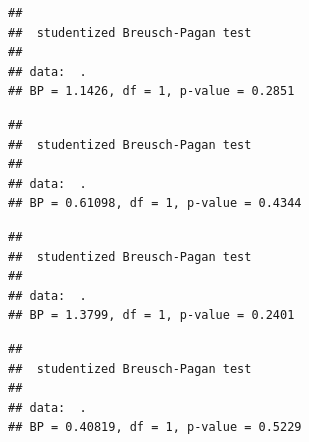 \documentclass[11pt,]{article}
\newenvironment{Shaded}{\begin{snugshade}}{\end{snugshade}}
\newcommand{\KeywordTok}[1]{\textcolor[rgb]{0.13,0.29,0.53}{\textbf{#1}}}
\newcommand{\StringTok}[1]{\textcolor[rgb]{0.31,0.60,0.02}{#1}}
\newcommand{\OperatorTok}[1]{\textcolor[rgb]{0.81,0.36,0.00}{\textbf{#1}}}
\newcommand{\NormalTok}[1]{#1}
\begin{document}
\begin{verbatim}
## 
##  studentized Breusch-Pagan test
## 
## data:  .
## BP = 1.1426, df = 1, p-value = 0.2851
\end{verbatim}

\begin{Shaded}
\end{Shaded}

\begin{verbatim}
## 
##  studentized Breusch-Pagan test
## 
## data:  .
## BP = 0.61098, df = 1, p-value = 0.4344
\end{verbatim}

\begin{Shaded}
\end{Shaded}

\begin{verbatim}
## 
##  studentized Breusch-Pagan test
## 
## data:  .
## BP = 1.3799, df = 1, p-value = 0.2401
\end{verbatim}

\begin{Shaded}
\end{Shaded}

\begin{verbatim}
## 
##  studentized Breusch-Pagan test
## 
## data:  .
## BP = 0.40819, df = 1, p-value = 0.5229
\end{verbatim}

\begin{Shaded}
\end{Shaded}
\end{document}
